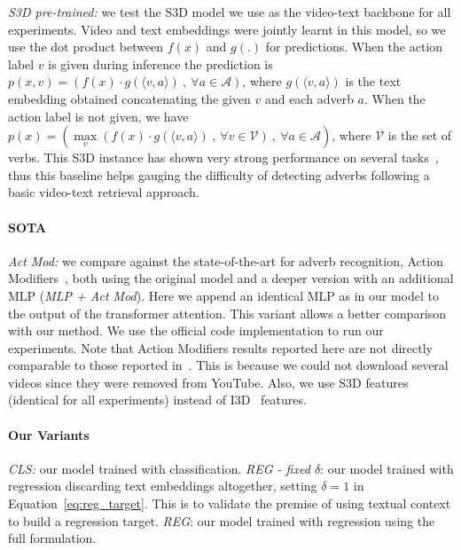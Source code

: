 \documentclass[10pt,twocolumn,letterpaper]{article}
\newcommand{\fparagraph}[1]{\paragraph{#1}}
\begin{document}
\textit{S3D pre-trained:} we test the S3D model we use as the video-text backbone 
for all experiments. 
Video and text embeddings were jointly learnt in this model, so we use the dot product between $f(x)$ and $g(.)$ for predictions. When the action label $v$ is given during inference the prediction is $p(x, v) = (f(x) \cdot g( \langle v, a \rangle) \ , \  \forall a \in \mathcal{A})$, where $g(\langle v, a\rangle)$ is the text embedding obtained concatenating the given $v$ and each adverb $a$. When the action label is not given, we have $p(x) = (\max\limits_{v}(f(x) \cdot g(\langle v, a\rangle) \ , \  \forall v \in \mathcal{V}) \ , \ \forall a \in \mathcal{A})$, where $\mathcal{V}$ is the set of verbs. This S3D instance has shown very strong performance on several tasks~\cite{miech19endtoend}, thus this baseline helps gauging 
the difficulty of detecting adverbs following a basic video-text retrieval approach.

\vspace{-12pt}

\fparagraph{SOTA}\textit{Act Mod:} we compare against the state-of-the-art for adverb recognition, Action Modifiers~\cite{doughty2020action}, 
both using the original model and a deeper version with an additional MLP (\textit{MLP + Act Mod}). Here we append an identical MLP as in our model to the output of the transformer attention. This variant allows a better comparison with our method. 
We use the official code implementation to run our experiments. Note that Action Modifiers results reported here are not directly comparable to those reported in~\cite{doughty2020action, doughty2022you}. This is because we could not download several videos since they were removed from YouTube. Also, we use 
S3D features (identical for all experiments) instead of I3D~\cite{carreira2017quo} features. 

\vspace{-13pt}

\fparagraph{Our Variants}\textit{CLS:} our model trained with classification. \textit{REG - fixed $\delta$}: our model trained with regression discarding text embeddings altogether, setting $\delta=1$ in Equation~\ref{eq:reg_target}. This is to validate the premise of using textual context to build a regression target.
\textit{REG}: our model trained with regression using the full formulation.

\vspace{-13pt}
\end{document}
